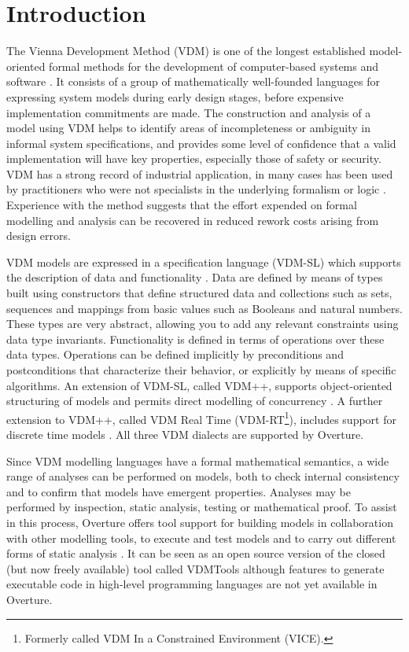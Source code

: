 \documentclass{overturerepchap}
\begin{document}
\chapter{Introduction}

The Vienna Development Method (VDM) is one of the longest established
model-oriented formal methods for the development of computer-based
systems and software
\cite{Bjorner&78,Jones90a,Fitzgerald&08c}. It consists of a
group of mathematically well-founded languages for expressing system
models during early design stages, before expensive implementation
commitments are made. The construction and analysis of a model using
VDM helps to identify areas of incompleteness or ambiguity in
informal system specifications, and provides some level of confidence
that a valid implementation will have key properties, especially those
of safety or security. VDM has a strong record of industrial
application, in many cases has been used
by practitioners who were not specialists in
the underlying formalism or logic
\cite{Larsen&96b,Clement&99,Kurita&09}. Experience with the method
suggests that the effort expended on formal modelling and analysis can
be recovered in reduced rework costs arising from design errors.

VDM models are expressed in a specification language (VDM-SL) which
supports the description of data and functionality
\cite{ISOVDM96a,Fitzgerald&98b,Fitzgerald&09}. Data are defined by
means of types built using constructors that define structured data
and collections such as sets, sequences and mappings from basic values
such as Booleans and natural numbers. These types are very abstract,
allowing you to add any relevant constraints using data type
invariants. Functionality is defined in terms of operations over these
data types. Operations can be defined implicitly by preconditions and
postconditions that characterize their behavior, or explicitly by
means of specific algorithms. An extension of VDM-SL, called VDM++,
supports object-oriented structuring of models and permits direct
modelling of concurrency \cite{Fitzgerald&05}. A further extension
to VDM++, called VDM Real Time (VDM-RT\footnote{Formerly called VDM In a
Constrained Environment (VICE).}), includes support for discrete
time models \cite{Mukherjee&00,Verhoef&06b}. All
three VDM dialects are supported by Overture.

Since VDM modelling languages have a formal mathematical semantics,
a wide range of analyses can be performed on models, both to check
internal consistency and to confirm that models have emergent
properties. Analyses may be performed by inspection, static analysis,
testing or mathematical proof. To assist in this process, Overture
offers tool support for building models in collaboration with other
modelling tools, to execute and test models and to carry out different
forms of static analysis \cite{Larsen&13b}. It can be seen as an open
source version of the closed (but now freely available) tool called VDMTools
\cite{Elmstrom&94,Larsen01,Fitzgerald&08a} although features to
generate executable code in high-level programming languages are
not yet available in Overture.
\end{document}
